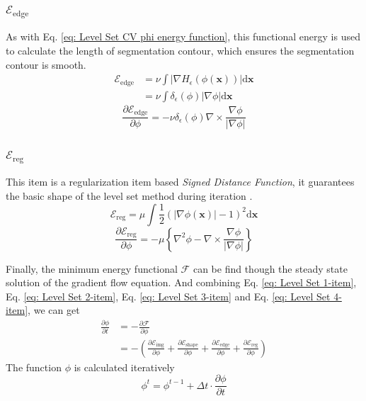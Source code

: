 \subsubsection{$\mathcal{E}_{\text{edge}}$}
As with Eq. \ref{eq: Level Set CV phi energy function}, this functional energy is used to calculate the length of segmentation contour, which ensures the segmentation contour is smooth.
\begin{align}
    \mathcal{E}_{\text{edge}}
    & = \nu \int \left| \nabla H_\epsilon(\phi(\mathbf{x})) \right|\mathrm{d}\mathbf{x} \nonumber \\
    & = \nu \int \delta_\epsilon(\phi)|\nabla\phi|\mathrm{d}\mathbf{x}
\end{align}
\begin{equation}\label{eq: Level Set 3-item}
    \frac{\partial \mathcal{E}_{\text{edge}}}{\partial \phi} = - \nu \delta_\epsilon(\phi)\nabla \times \frac{\nabla \phi}{|\nabla \phi|}
\end{equation}

\subsubsection{$\mathcal{E}_{\text{reg}}$}
This item is a regularization item based \emph{Signed Distance Function}, it guarantees the basic shape of the level set method during iteration \cite{LevelSet:mathod:li2005level} \cite{LevelSet:mathod:li2010distance}.
\begin{equation*}
    \mathcal{E}_{\text{reg}} = \mu \int \frac{1}{2} \left( |\nabla\phi(\mathbf{x})| -1 \right)^2\mathrm{d}\mathbf{x}
\end{equation*}
\begin{equation}\label{eq: Level Set 4-item}
    \frac{\partial \mathcal{E}_{\text{reg}}}{\partial \phi} = -\mu\left\{ \nabla^2\phi - \nabla \times \frac{\nabla\phi}{|\nabla\phi|} \right\}
\end{equation}

Finally, the minimum energy functional $\mathcal{F}$ can be find though the steady state solution of the gradient flow equation. And combining Eq. \ref{eq: Level Set 1-item}, Eq. \ref{eq: Level Set 2-item}, Eq. \ref{eq: Level Set 3-item} and Eq. \ref{eq: Level Set 4-item}, we can get
\begin{align}
    \frac{\partial \phi}{\partial t}
    & = -\frac{\partial \mathcal{F}}{\partial \phi} \nonumber \\
    & = -\left( \frac{\partial \mathcal{E}_{\text{img}}}{\partial \phi}
        + \frac{\partial \mathcal{E}_{\text{shape}}}{\partial \phi}
        + \frac{\partial \mathcal{E}_{\text{edge}}}{\partial \phi}
        + \frac{\partial \mathcal{E}_{\text{reg}}}{\partial \phi} \right)
\end{align}
The function $\phi$ is calculated iteratively
\begin{equation} \label{eq: iter Level Set}
    \phi^t = \phi^{t-1} + \Delta t \cdot \frac{\partial \phi}{\partial t}
\end{equation}


